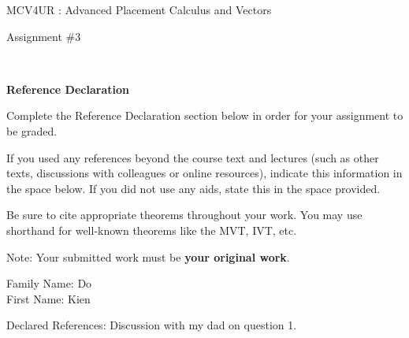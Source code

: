 \documentclass[12pt]{book}
\begin{document}
\vspace{-1.0in}\begin{center}
\Large{MCV4UR : Advanced Placement Calculus and Vectors }

\Large{Assignment \#3}


\end{center}


\vspace{0.015in}\hrulefill\ 

\textbf{Reference Declaration} %

Complete the Reference Declaration section below in order for your assignment to be graded.

If you used any references beyond the course text and lectures (such as other texts, discussions with colleagues or online resources), indicate this information in the space below.  If you did not use any aids, state this in the space provided. 

Be sure to cite appropriate theorems throughout your work. You may use shorthand for well-known theorems like the MVT, IVT, etc. 

Note: Your submitted work must be \textbf{your original work}. 

Family Name: Do\\%
First Name: Kien%

Declared References: Discussion with my dad on question 1.


\vspace{0.015in}\hrulefill\ 

\newpage

\end{document}
